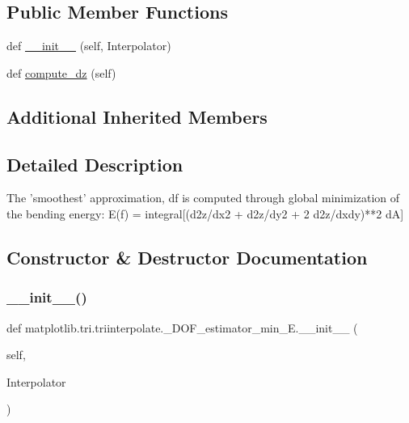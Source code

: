 \subsection*{Public Member Functions}
\begin{DoxyCompactItemize}
\item 
def \hyperlink{classmatplotlib_1_1tri_1_1triinterpolate_1_1__DOF__estimator__min__E_ad88faab758ea2250b843ae54abd8e992}{\+\_\+\+\_\+init\+\_\+\+\_\+} (self, Interpolator)
\item 
def \hyperlink{classmatplotlib_1_1tri_1_1triinterpolate_1_1__DOF__estimator__min__E_a2b227263b9ef56813ce3b68d754385af}{compute\+\_\+dz} (self)
\end{DoxyCompactItemize}
\subsection*{Additional Inherited Members}


\subsection{Detailed Description}
\begin{DoxyVerb}The 'smoothest' approximation, df is computed through global minimization
of the bending energy:
  E(f) = integral[(d2z/dx2 + d2z/dy2 + 2 d2z/dxdy)**2 dA]
\end{DoxyVerb}
 

\subsection{Constructor \& Destructor Documentation}
\mbox{\label{classmatplotlib_1_1tri_1_1triinterpolate_1_1__DOF__estimator__min__E_ad88faab758ea2250b843ae54abd8e992}} 
\subsubsection{\texorpdfstring{\+\_\+\+\_\+init\+\_\+\+\_\+()}{\_\_init\_\_()}}
{\footnotesize\ttfamily def matplotlib.\+tri.\+triinterpolate.\+\_\+\+D\+O\+F\+\_\+estimator\+\_\+min\+\_\+\+E.\+\_\+\+\_\+init\+\_\+\+\_\+ (\begin{DoxyParamCaption}\item[{}]{self,  }\item[{}]{Interpolator }\end{DoxyParamCaption})}



